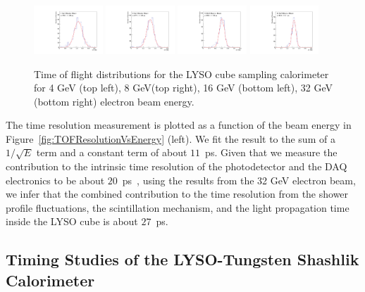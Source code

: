 \begin{figure}[H] \centering
\includegraphics[width=0.23\textwidth]{figs/TOF_Electron_LYSOCube_4GeV} 
\includegraphics[width=0.23\textwidth]{figs/TOF_Electron_LYSOCube_8GeV} 
\includegraphics[width=0.23\textwidth]{figs/TOF_Electron_LYSOCube_16GeV} 
\includegraphics[width=0.23\textwidth]{figs/TOF_Electron_LYSOCube_32GeV} 
\caption{ \small Time of flight distributions for the LYSO cube sampling calorimeter
for 4 GeV (top left), 8 GeV(top right), 16 GeV (bottom left),  32 GeV (bottom right) electron beam energy. } 
\label{fig:LYSOCubeTOF}
\end{figure}

The time resolution measurement is plotted as a function of the
beam energy in Figure~\ref{fig:TOFResolutionVsEnergy} (left). We fit the result to the sum of a 
$1/\sqrt{E}$ term and a constant term of about $11$~ps.   Given that we measure the contribution 
to the intrinsic time resolution of the photodetector and the DAQ electronics to be about 
$20$~ps~\cite{MCPFastCaloNIMA}, using the results from the 32 GeV electron beam, we infer 
that the combined contribution to the time resolution from the shower profile
fluctuations, the scintillation mechanism, and the light propagation time inside the
LYSO cube is about $27$~ps.  

\subsection{Timing Studies of the LYSO-Tungsten Shashlik Calorimeter}
